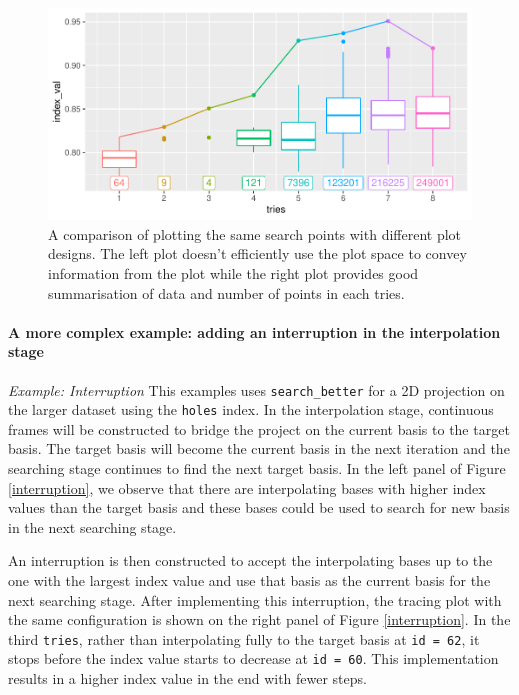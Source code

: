\documentclass[12pt]{article}
\begin{document}
\begin{figure}
\centering
\includegraphics{paper_files/figure-latex/points-tries-1.pdf}
\caption{\label{points}A comparison of plotting the same search points
with different plot designs. The left plot doesn't efficiently use the
plot space to convey information from the plot while the right plot
provides good summarisation of data and number of points in each tries.}
\end{figure}

\hypertarget{a-more-complex-example-adding-an-interruption-in-the-interpolation-stage}{%
\paragraph{A more complex example: adding an interruption in the
interpolation
stage}\label{a-more-complex-example-adding-an-interruption-in-the-interpolation-stage}}

\emph{Example: Interruption} This examples uses \texttt{search\_better}
for a 2D projection on the larger dataset using the \texttt{holes}
index. In the interpolation stage, continuous frames will be constructed
to bridge the project on the current basis to the target basis. The
target basis will become the current basis in the next iteration and the
searching stage continues to find the next target basis. In the left
panel of Figure \ref{interruption}, we observe that there are
interpolating bases with higher index values than the target basis and
these bases could be used to search for new basis in the next searching
stage.

An interruption is then constructed to accept the interpolating bases up
to the one with the largest index value and use that basis as the
current basis for the next searching stage. After implementing this
interruption, the tracing plot with the same configuration is shown on
the right panel of Figure \ref{interruption}. In the third
\texttt{tries}, rather than interpolating fully to the target basis at
\texttt{id\ =\ 62}, it stops before the index value starts to decrease
at \texttt{id\ =\ 60}. This implementation results in a higher index
value in the end with fewer steps.
\end{document}
